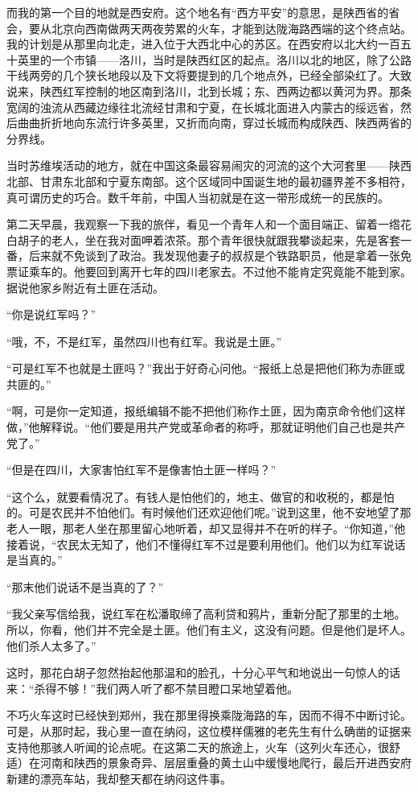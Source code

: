 \documentclass[10pt]{book}
\begin{document}
而我的第一个目的地就是西安府。这个地名有“西方平安”的意思，是陕西省的省会，要从北京向西南做两天两夜劳累的火车，才能到达陇海路西端的这个终点站。我的计划是从那里向北走，进入位于大西北中心的苏区。在西安府以北大约一百五十英里的一个市镇——洛川，当时是陕西红区的起点。洛川以北的地区，除了公路干线两旁的几个狭长地段以及下文将要提到的几个地点外，已经全部染红了。大致说来，陕西红军控制的地区南到洛川，北到长城；东、西两边都以黄河为界。那条宽阔的浊流从西藏边缘往北流经甘肃和宁夏，在长城北面进入内蒙古的绥远省，然后曲曲折折地向东流行许多英里，又折而向南，穿过长城而构成陕西、陕西两省的分界线。

当时苏维埃活动的地方，就在中国这条最容易闹灾的河流的这个大河套里——陕西北部、甘肃东北部和宁夏东南部。这个区域同中国诞生地的最初疆界差不多相符，真可谓历史的巧合。数千年前，中国人当初就是在这一带形成统一的民族的。

第二天早晨，我观察一下我的旅伴，看见一个青年人和一个面目端正、留着一绺花白胡子的老人，坐在我对面呷着浓茶。那个青年很快就跟我攀谈起来，先是客套一番，后来就不免谈到了政治。我发现他妻子的叔叔是个铁路职员，他是拿着一张免票证乘车的。他要回到离开七年的四川老家去。不过他不能肯定究竟能不能到家。据说他家乡附近有土匪在活动。

“你是说红军吗？”

“哦，不，不是红军，虽然四川也有红军。我说是土匪。”

“可是红军不也就是土匪吗？”我出于好奇心问他。“报纸上总是把他们称为赤匪或共匪的。”

“啊，可是你一定知道，报纸编辑不能不把他们称作土匪，因为南京命令他们这样做，”他解释说。“他们要是用共产党或革命者的称呼，那就证明他们自己也是共产党了。”

“但是在四川，大家害怕红军不是像害怕土匪一样吗？”

“这个么，就要看情况了。有钱人是怕他们的，地主、做官的和收税的，都是怕的。可是农民并不怕他们。有时候他们还欢迎他们呢。”说到这里，他不安地望了那老人一眼，那老人坐在那里留心地听着，却又显得并不在听的样子。“你知道，”他接着说，“农民太无知了，他们不懂得红军不过是要利用他们。他们以为红军说话是当真的。”

“那末他们说话不是当真的了？”

“我父亲写信给我，说红军在松潘取缔了高利贷和鸦片，重新分配了那里的土地。所以，你看，他们并不完全是土匪。他们有主义，这没有问题。但是他们是坏人。他们杀人太多了。”

这时，那花白胡子忽然抬起他那温和的脸孔，十分心平气和地说出一句惊人的话来：“杀得不够！”我们两人听了都不禁目瞪口呆地望着他。

不巧火车这时已经快到郑州，我在那里得换乘陇海路的车，因而不得不中断讨论。可是，从那时起，我心里一直在纳闷，这位模样儒雅的老先生有什么确凿的证据来支持他那骇人听闻的论点呢。在这第二天的旅途上，火车（这列火车还心，很舒适）在河南和陕西的景象奇异、层层重叠的黄土山中缓慢地爬行，最后开进西安府新建的漂亮车站，我却整天都在纳闷这件事。
\end{document}
